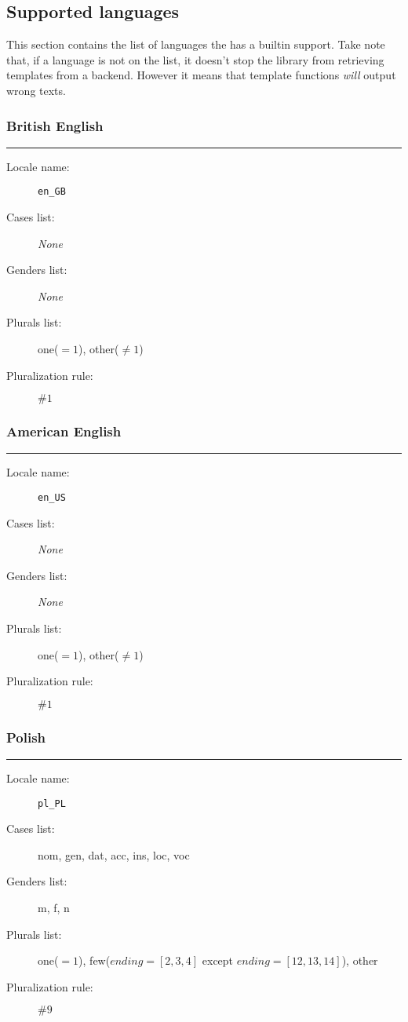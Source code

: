 \subsection{Supported languages}\label{supLangs}

This section contains the list of languages the \mulan{} has a builtin support. 
Take note that, if a language is not on the list, it doesn't stop the library from retrieving templates from a backend.
However it means that template functions \emph{will} output wrong texts. 

\def\none{\textit{None}}
\def\langName#1{\subsubsection*{#1}\hrule\vspace{1em}}

\langName{British English}
\begin{description}
	\item[Locale name:] \texttt{en\_GB}
	\item[Cases list:] \none
	\item[Genders list:] \none
	\item[Plurals list:] one($=1$), other($\not=1$)
	\item[Pluralization rule:] $\#1$
\end{description}

\langName{American English}
\begin{description}
	\item[Locale name:] \texttt{en\_US}
	\item[Cases list:] \none
	\item[Genders list:] \none
	\item[Plurals list:] one($=1$), other($\not=1$)
	\item[Pluralization rule:] $\#1$
\end{description}

\langName{Polish}
\begin{description}
	\item[Locale name:] \texttt{pl\_PL}
	\item[Cases list:] nom, gen, dat, acc, ins, loc, voc
	\item[Genders list:] m, f, n
	\item[Plurals list:] one($=1$), few($ending=[2,3,4]$ except $ending=[12,13,14]$), other
	\item[Pluralization rule:] $\#9$
\end{description}
